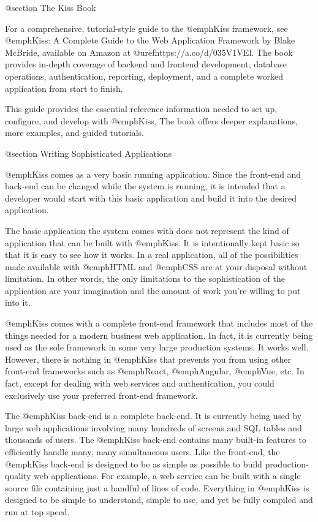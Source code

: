 @section The Kiss Book

For a comprehensive, tutorial-style guide to the @emph{Kiss} framework,
see @emph{Kiss: A Complete Guide to the Web Application Framework} by
Blake McBride, available on Amazon at @uref{https://a.co/d/035V1VEl}.
The book provides in-depth coverage of backend and frontend
development, database operations, authentication, reporting,
deployment, and a complete worked application from start to finish.

This guide provides the essential reference information needed to
set up, configure, and develop with @emph{Kiss}.  The book offers
deeper explanations, more examples, and guided tutorials.

@section Writing Sophisticated Applications

@emph{Kiss} comes as a very basic running application. Since the
front-end and back-end can be changed while the system is running, it
is intended that a developer would start with this basic application
and build it into the desired application.

The basic application the system comes with does not represent the
kind of application that can be built with @emph{Kiss}. It is
intentionally kept basic so that it is easy to see how it works.  In a
real application, all of the possibilities made available with
@emph{HTML} and @emph{CSS} are at your disposal without limitation. In
other words, the only limitations to the sophistication of the
application are your imagination and the amount of work you're willing
to put into it.

@emph{Kiss} comes with a complete front-end framework that includes
most of the things needed for a modern business web application. In
fact, it is currently being used as the sole framework in some very
large production systems.  It works well. However, there is nothing in
@emph{Kiss} that prevents you from using other front-end frameworks such as
@emph{React}, @emph{Angular}, @emph{Vue}, etc. In fact, except for
dealing with web services and authentication, you could exclusively
use your preferred front-end framework.

The @emph{Kiss} back-end is a complete back-end. It is currently
being used by large web applications involving many hundreds of
screens and SQL tables and thousands of users. The @emph{Kiss}
back-end contains many built-in features to efficiently handle many,
many simultaneous users. Like the front-end, the @emph{Kiss} back-end
is designed to be as simple as possible to build production-quality
web applications. For example, a web service can be built with a single
source file containing just a handful of lines of code. Everything in
@emph{Kiss} is designed to be simple to understand, simple to use, and
yet be fully compiled and run at top speed.

